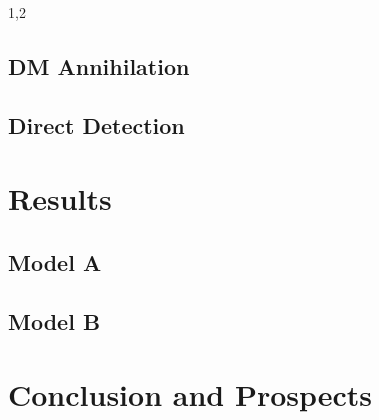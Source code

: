 \documentclass[11pt,a4paper,twoside]{article}
\begin{document}
\begin{spacing}{1,2}
\subsection{DM Annihilation}

\subsection{Direct Detection}

\section{Results}
\subsection{Model A}
\subsection{Model B}
\section{Conclusion and Prospects}



\end{spacing}
\end{document}
